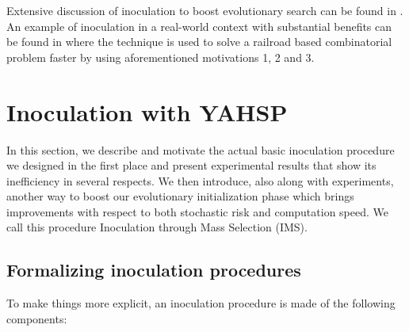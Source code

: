 \documentclass[english]{DESCARWINreport}
\begin{document}
Extensive discussion of inoculation to boost evolutionary search can be found in \cite{Surry96, SurryPhD}. An example of inoculation in a real-world context with substantial benefits can be found in \cite{semetGECCO06} where the technique is used to solve a railroad based combinatorial problem faster by using aforementioned motivations 1, 2 and 3.




\newpage
\chapter{Inoculation with YAHSP}

In this section, we describe and motivate the actual basic inoculation procedure we designed in the first place and present experimental results that show its inefficiency in several respects. We then introduce, also along with experiments, another way to boost our evolutionary initialization phase which brings improvements with respect to both stochastic risk and computation speed. We call this procedure Inoculation through Mass Selection (IMS).

\section{Formalizing inoculation procedures}

To make things more explicit, an inoculation procedure is made of the following components:
\end{document}
